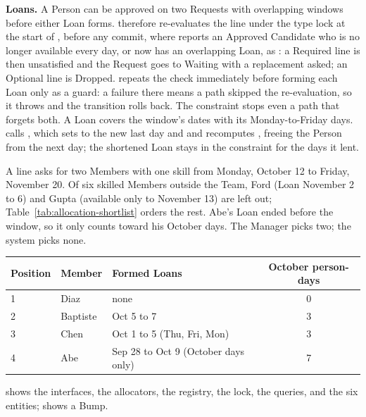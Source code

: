\textbf{Loans.} A Person can be approved on two Requests with overlapping windows before either Loan forms.  therefore re-evaluates the line under the type lock at the start of , before any commit, where  reports an Approved Candidate who is no longer available every day, or now has an overlapping Loan, as : a Required line is then unsatisfied and the Request goes to Waiting with a replacement asked; an Optional line is Dropped.  repeats the check immediately before forming each Loan only as a guard: a failure there means a path skipped the re-evaluation, so it throws  and the transition rolls back. The  constraint stops even a path that forgets both. A Loan covers the window's dates with  its Monday-to-Friday days.  calls , which sets  to the new last day and  and recomputes , freeing the Person from the next day; the shortened Loan stays in the constraint for the days it lent.

A line asks for two Members with one skill from Monday, October 12 to Friday, November 20. Of six skilled Members outside the Team, Ford (Loan November 2 to 6) and Gupta (available only to November 13) are left out; Table~\ref{tab:allocation-shortlist} orders the rest. Abe's Loan ended before the window, so it only counts toward his October days. The Manager picks two; the system picks none.
\begin{center}\footnotesize
{}\label{tab:allocation-shortlist}
\begin{tabular}{@{}lllc@{}}
\toprule
Position & Member & Formed Loans & October person-days \\
\midrule
1 & Diaz & none & 0 \\
2 & Baptiste & Oct 5 to 7 & 3 \\
3 & Chen & Oct 1 to 5 (Thu, Fri, Mon) & 3 \\
4 & Abe & Sep 28 to Oct 9 (October days only) & 7 \\
\bottomrule
\end{tabular}
\end{center}

 shows the interfaces, the allocators, the registry, the lock, the queries, and the six entities;  shows a Bump.

